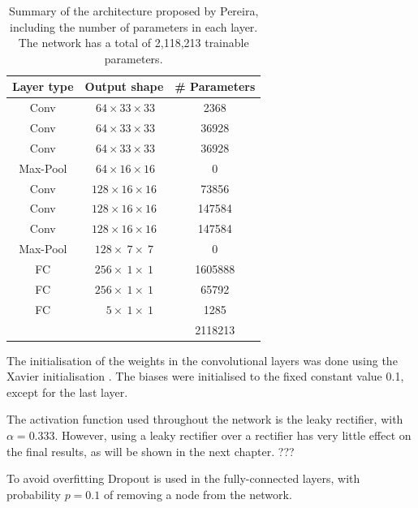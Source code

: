 \documentclass[12pt,a4paper,twoside,openright]{report}
\begin{document}
\begin{table}
\centering	
\label{table:pereira_weights}
\begin{tabular}{ c c S[table-format=7.0] } 
\textbf{Layer type} & \textbf{Output shape} & \textbf{\# Parameters} \\
 \hline
 Conv 		& $\ 64 	\times 33 	\times 33$ 	& 2368 \\ 
 Conv 		& $\ 64 	\times 33 	\times 33$ 	& 36928 \\ 
 Conv 		& $\ 64 	\times 33 	\times 33$	& 36928 \\ 
Max-Pool 	& $\ 64 	\times 16 	\times 16$ 	& 0\\
 Conv 		& $128 		 \times 16 	\times 16$	& 73856 \\ 
 Conv 		& $128 		\times 16 	\times 16$ 	& 147584 \\ 
 Conv 		& $128 		\times 16 	\times 16$ 	& 147584 \\ 
Max-Pool 	& $128 		\times\ 7 	\times\ 7$	& 0\\
FC			& $256 		\times\ 1 	\times\ 1$	& 1605888\\
FC			& $256 		\times\ 1 	\times\ 1$	& 65792\\
FC			& $\quad 5 	\times\ 1 	\times\ 1$ 	& 1285\\
\hhline{~~=}
\rule{0pt}{3ex}    
&& 2118213\\
\end{tabular}
\caption[Summary of the architecture proposed by Pereira, including the number of parameters in each layer.]{Summary of the architecture proposed by Pereira, including the number of parameters in each layer. The network has a total of 2,118,213 trainable parameters.}
\end{table}


The initialisation of the weights in the convolutional layers was done using the Xavier initialisation \cite{Xavier_ini}. The biases were initialised to the fixed constant value 0.1, except for the last layer.

The activation function used throughout the network is the leaky rectifier, with  $\alpha = 0.333$. However, using a leaky rectifier over a rectifier has very little effect on the final results, as will be shown in the next chapter. ???

To avoid overfitting Dropout \cite{} is used in the fully-connected layers, with probability $p=0.1$ of removing a node from the network.
\end{document}
